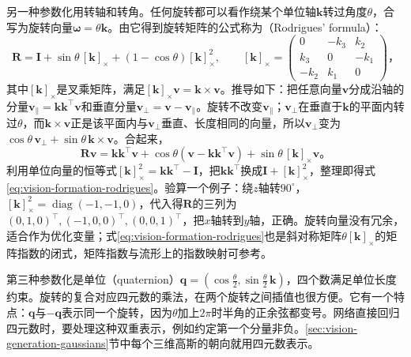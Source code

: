另一种参数化用转轴和转角。任何旋转都可以看作绕某个单位轴$\bm k$转过角度$\theta$，合写为旋转向量$\bm\omega=\theta\bm k$。由它得到旋转矩阵的公式称为（Rodrigues' formula）：
\begin{equation}
  \bm R=\bm I+\sin\theta\,[\bm k]_\times+(1-\cos\theta)[\bm k]_\times^2,\qquad
  [\bm k]_\times=\begin{pmatrix}0&-k_3&k_2\\k_3&0&-k_1\\-k_2&k_1&0\end{pmatrix}\text{，}
  \label{eq:vision-formation-rodrigues}
\end{equation}
其中$[\bm k]_\times$是叉乘矩阵，满足$[\bm k]_\times\bm v=\bm k\times\bm v$。推导如下：把任意向量$\bm v$分成沿轴的分量$\bm v_\parallel=\bm k\bm k^\top\bm v$和垂直分量$\bm v_\perp=\bm v-\bm v_\parallel$。旋转不改变$\bm v_\parallel$；$\bm v_\perp$在垂直于$\bm k$的平面内转过$\theta$，而$\bm k\times\bm v$正是该平面内与$\bm v_\perp$垂直、长度相同的向量，所以$\bm v_\perp$变为$\cos\theta\,\bm v_\perp+\sin\theta\,\bm k\times\bm v$。合起来，
\[
  \bm R\bm v=\bm k\bm k^\top\bm v+\cos\theta(\bm v-\bm k\bm k^\top\bm v)+\sin\theta\,[\bm k]_\times\bm v\text{。}
\]
利用单位向量的恒等式$[\bm k]_\times^2=\bm k\bm k^\top-\bm I$，把$\bm k\bm k^\top$换成$\bm I+[\bm k]_\times^2$，整理即得式\eqref{eq:vision-formation-rodrigues}。验算一个例子：绕$z$轴转$90^\circ$，$[\bm k]_\times^2=\operatorname{diag}(-1,-1,0)$，代入得$\bm R$的三列为$(0,1,0)^\top,(-1,0,0)^\top,(0,0,1)^\top$，把$x$轴转到$y$轴，正确。旋转向量没有冗余，适合作为优化变量；式\eqref{eq:vision-formation-rodrigues}也是斜对称矩阵$\theta[\bm k]_\times$的矩阵指数的闭式，矩阵指数与流形上的指数映射可参考。

第三种参数化是单位（quaternion）$\bm q=(\cos\tfrac\theta2,\sin\tfrac\theta2\,\bm k)$，四个数满足单位长度约束。旋转的复合对应四元数的乘法，在两个旋转之间插值也很方便。它有一个特点：$\bm q$与$-\bm q$表示同一个旋转，因为$\theta$加上$2\pi$时半角的正余弦都变号。网络直接回归四元数时，要处理这种双重表示，例如约定第一个分量非负。\ref{sec:vision-generation-gaussians}节中每个三维高斯的朝向就用四元数表示。

